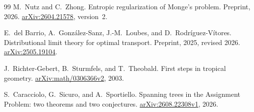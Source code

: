 \documentclass[11pt,reqno]{amsart}
\theoremstyle{definition}
\theoremstyle{remark}
\numberwithin{equation}{section}
\begin{document}
\begin{thebibliography}{99}
M.~Nutz and C.~Zhong.
Entropic regularization of Monge's problem.
Preprint, 2026.
\href{https://arxiv.org/abs/2604.21578}{arXiv:2604.21578}, version~2.

E.~del Barrio, A.~Gonz\'alez-Sanz, J.-M.~Loubes, and
D.~Rodr\'iguez-V\'itores.
Distributional limit theory for optimal transport.
Preprint, 2025, revised 2026.
\href{https://arxiv.org/abs/2505.19104}{arXiv:2505.19104}.

J.~Richter-Gebert, B.~Sturmfels, and T.~Theobald.
First steps in tropical geometry.
\href{https://arxiv.org/abs/math/0306366v2}{arXiv:math/\allowbreak0306366v2}, 2003.

S.~Caracciolo, G.~Sicuro, and A.~Sportiello.
Spanning trees in the Assignment Problem: two theorems and two conjectures.
\href{https://arxiv.org/abs/2608.22308v1}{arXiv:2608.22308v1}, 2026.

\end{thebibliography}
\end{document}
